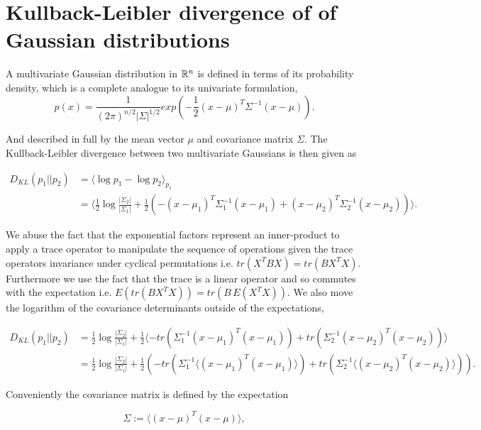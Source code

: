\chapter{Kullback-Leibler divergence of of Gaussian distributions}\label{appendix:kl_gauss}

A multivariate Gaussian distribution in $\mathbb{R}^n$ is defined in terms of its probability density, which is a complete analogue to its univariate formulation, 
\begin{equation}\label{eq:multi_gauss}
p(x) = \frac{1}{(2\pi)^{n/2}|\Sigma|^{1/2}}exp(-\frac{1}{2}(x- \mu)^T\Sigma^{-1}(x-\mu)).
\end{equation}

\noindent And described in full by the mean vector $\mu$ and covariance matrix $\Sigma$. The  Kullback-Leibler divergence between two multivariate Gaussians is then given as 

\begin{align*}
D_{KL}(p_1|| p_2 ) &= \langle \log p_1 - \log p_2 \rangle_{p_1} \\
&= \langle \frac{1}{2}\log \frac{|\Sigma_2|}{|\Sigma_1|} + \frac{1}{2} (-(x- \mu_1)^T\Sigma_1^{-1}(x-\mu_1) + (x- \mu_2)^T\Sigma_2^{-1}(x-\mu_2))   \rangle.
\end{align*}

\noindent We abuse the fact that the exponential factors represent an inner-product to apply a trace operator to manipulate the sequence of operations given the trace operators invariance under cyclical permutations i.e. $tr(X^TBX) = tr(BX^TX)$. Furthermore we use the fact that the trace is a linear operator and so commutes with the expectation i.e. $E(tr(BX^TX)) = tr(B\, E(X^TX))$. We also move the logarithm of the covariance determinants outside of the expectations, 

\begin{align*}
D_{KL}(p_1|| p_2 ) &= \frac{1}{2}\log \frac{|\Sigma_2|}{|\Sigma_1|} + \frac{1}{2} \langle - tr(\Sigma^{-1}_1(x-\mu_1)^T(x-\mu_1)) + tr(\Sigma^{-1}_2(x-\mu_2)^T(x-\mu_2))\rangle \\
&= \frac{1}{2}\log \frac{|\Sigma_2|}{|\Sigma_1|} + \frac{1}{2} (- tr(\Sigma^{-1}_1\langle(x-\mu_1)^T(x-\mu_1)\rangle) + tr(\Sigma^{-1}_2\langle(x-\mu_2)^T(x-\mu_2)\rangle)).
\end{align*}

\noindent Conveniently the covariance matrix is defined by the expectation 

\begin{equation}
\Sigma := \langle (x-\mu)^T(x-\mu)\rangle, 
\end{equation}

